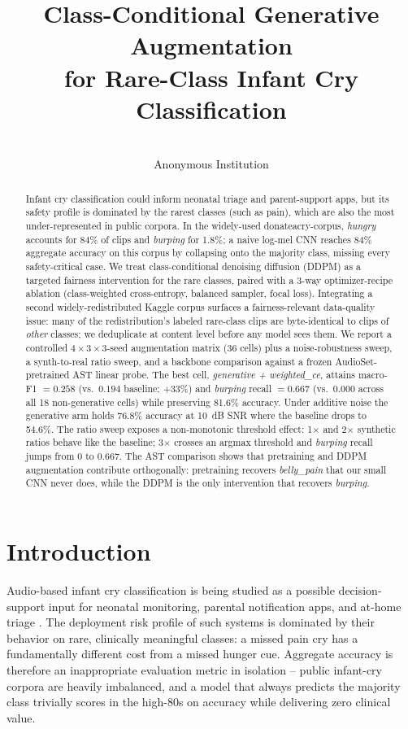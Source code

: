 \documentclass[pmlr,twocolumn,10pt]{jmlr}
\title[Generative Augmentation for Rare-Class Cry Classification]{Class-Conditional Generative Augmentation\\for Rare-Class Infant Cry Classification}
\author{\Name{Anonymous Authors} \Email{anonymous@anon}\\
\addr Anonymous Institution
}
\begin{document}
\maketitle

\begin{abstract}
Infant cry classification could inform neonatal triage and parent-support apps, but its safety profile is dominated by the rarest classes (such as pain), which are also the most under-represented in public corpora. In the widely-used donateacry-corpus, \textit{hungry} accounts for 84\% of clips and \textit{burping} for 1.8\%; a naive log-mel CNN reaches 84\% aggregate accuracy on this corpus by collapsing onto the majority class, missing every safety-critical case. We treat class-conditional denoising diffusion (DDPM) as a targeted fairness intervention for the rare classes, paired with a 3-way optimizer-recipe ablation (class-weighted cross-entropy, balanced sampler, focal loss). Integrating a second widely-redistributed Kaggle corpus surfaces a fairness-relevant data-quality issue: many of the redistribution's labeled rare-class clips are byte-identical to clips of \emph{other} classes; we deduplicate at content level before any model sees them. We report a controlled $4 \times 3 \times 3$-seed augmentation matrix (36 cells) plus a noise-robustness sweep, a synth-to-real ratio sweep, and a backbone comparison against a frozen AudioSet-pretrained AST linear probe. The best cell, \textit{generative + weighted\_ce}, attains macro-F1 $= 0.258$ (vs.\ $0.194$ baseline; $+33$\%) and \textit{burping} recall $= 0.667$ (vs.\ $0.000$ across all 18 non-generative cells) while preserving 81.6\% accuracy. Under additive noise the generative arm holds 76.8\% accuracy at 10~dB SNR where the baseline drops to 54.6\%. The ratio sweep exposes a non-monotonic threshold effect: 1$\times$ and 2$\times$ synthetic ratios behave like the baseline; 3$\times$ crosses an argmax threshold and \textit{burping} recall jumps from 0 to 0.667. The AST comparison shows that pretraining and DDPM augmentation contribute orthogonally: pretraining recovers \textit{belly\_pain} that our small CNN never does, while the DDPM is the only intervention that recovers \textit{burping}.
\end{abstract}

\section{Introduction}\label{sec:intro}
Audio-based infant cry classification is being studied as a possible decision-support input for neonatal monitoring, parental notification apps, and at-home triage \citep{lavner2016baby}. The deployment risk profile of such systems is dominated by their behavior on rare, clinically meaningful classes: a missed pain cry has a fundamentally different cost from a missed hunger cue. Aggregate accuracy is therefore an inappropriate evaluation metric in isolation -- public infant-cry corpora are heavily imbalanced, and a model that always predicts the majority class trivially scores in the high-80s on accuracy while delivering zero clinical value.
\end{document}
